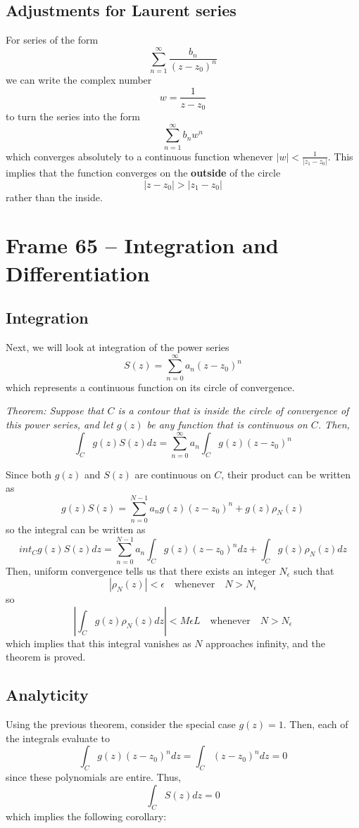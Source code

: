 \documentclass{article}
\renewcommand{\emph}{\textbf}
\begin{document}
\subsection{Adjustments for Laurent series}
For series of the form
\[
	\sum_{n=1}^\infty \frac{b_n}{(z - z_0)^n}
\]
we can write the complex number
\[
	w = \frac{1}{z - z_0}
\]
to turn the series into the form
\[
	\sum_{n=1}^\infty b_n w^n
\]
which converges absolutely to a continuous function whenever $|w| < \frac{1}{|z_1 - z_0|}$. This implies that the function converges on the \emph{outside} of the circle
\[
	|z - z_0| > |z_1 - z_0|
\]
rather than the inside.


\clearpage
\section{Frame 65 -- Integration and Differentiation}
\subsection{Integration}
Next, we will look at integration of the power series
\[
	S(z) = \sum_{n=0}^\infty a_n(z - z_0)^n
\]
which represents a continuous function on its circle of convergence.

\textit{Theorem: Suppose that $C$ is a contour that is inside the circle of convergence of this power series, and let $g(z)$ be any function that is continuous on $C$. Then,
\[
	\int_C g(z) S(z) dz = \sum_{n=0}^\infty a_n \int_C g(z) (z - z_0)^n
\]}

Since both $g(z)$ and $S(z)$ are continuous on $C$, their product can be written as
\[
	g(z) S(z) = \sum_{n=0}^{N-1} a_n g(z) (z - z_0)^n + g(z) \rho_N(z)
\]
so the integral can be written as
\[
	int_C g(z) S(z) dz = \sum_{n=0}^{N-1} a_n \int_C g(z) (z - z_0)^n dz
	+ \int_C g(z) \rho_N(z) dz
\]
Then, uniform convergence tells us that there exists an integer $N_\epsilon$ such that
\[
	|\rho_N(z)| < \epsilon \quad \text{whenever} \quad N > N_\epsilon
\]
so
\[
	\left| \int_C g(z) \rho_N(z) dz \right| < M\epsilon L \quad \text{whenever} \quad N > N_\epsilon
\]
which implies that this integral vanishes as $N$ approaches infinity, and the theorem is proved.

\subsection{Analyticity}
Using the previous theorem, consider the special case $g(z) = 1$. Then, each of the integrals evaluate to
\[
	\int_C g(z) (z - z_0)^n dz = \int_C (z - z_0)^n dz = 0
\]
since these polynomials are entire. Thus,
\[
	\int_C S(z) dz = 0
\]
which implies the following corollary:
\end{document}
